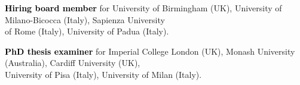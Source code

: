 

\vspace{0.2cm}
\textbf{\textcolor{black}{Hiring board member}} for University of Birmingham (UK), University of Milano-Bicocca (Italy), Sapienza University \\ \phantom{xx} of Rome (Italy), University of Padua (Italy). 

\vspace{0.2cm}
\textbf{\textcolor{black}{PhD thesis examiner}} for Imperial College London (UK), Monash University (Australia),  Cardiff University (UK), 
 \\ \phantom{xx} University of Pisa (Italy), University of Milan (Italy). %


